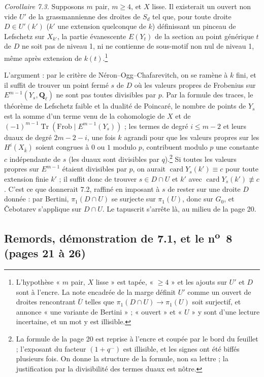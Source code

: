 \documentclass[11pt,a4paper]{article}
\begin{document}
\emph{Corollaire 7.3.} Supposons $m$ pair, $m \geqslant 4$, et $X$ lisse. Il
existerait un ouvert non vide $U'$ de la grassmannienne des droites de $S_d$ tel
que, pour toute droite $D \in U'(k')$ ($k'$ une extension quelconque de $k$)
définissant un pinceau de Lefschetz sur $X_{k'}$, la partie évanescente
$E(Y_t)$ de la section au point générique $t$ de $D$ ne soit pas de niveau 1, ni
ne contienne de sous-motif non nul de niveau 1, même après extension de
$k(t)$.\footnote{L'hypothèse « $m$ pair, $X$ lisse » est tapée, « $\geqslant 4$ »
et les ajouts sur $U'$ et $D$ sont à l'encre. La note encadrée de la marge définit
$U'$ comme un ouvert de droites rencontrant $\overline{U}$ telles que $\pi_1(D
\cap U) \to \pi_1(U)$ soit surjectif, et annonce « une variante de Bertini » ;
« ouvert » et « $U$ » y sont d'une lecture incertaine, et un mot y est illisible.}

L'argument : par le critère de Néron--Ogg--Chafarevitch, on se ramène à $k$ fini,
et il suffit de trouver un point fermé $s$ de $D$ où les valeurs propres de
Frobenius sur $E^{m-1}(Y_s, \mathbf{Q}_\ell)$ ne sont pas toutes divisibles par
$p$. Par la formule des traces, le théorème de Lefschetz faible et la dualité de
Poincaré, le nombre de points de $Y_s$ est la somme d'un terme venu de la
cohomologie de $X$ et de $(-1)^{m-1}\operatorname{Tr}(\mathrm{Frob} \mid
E^{m-1}(Y_s))$ ; les termes de degré $i \leqslant m-2$ et leurs duaux de degré
$2m-2-i$, une fois $k$ agrandi pour que les valeurs propres sur les
$H^i(X_{\bar k})$ soient congrues à $0$ ou $1$ modulo $p$, contribuent modulo
$p$ une constante $c$ indépendante de $s$ (les duaux sont divisibles par
$q$).\footnote{La formule de la page 20 est reprise à l'encre et coupée par le
bord du feuillet ; l'exposant du facteur $(1 + q^{\ldots})$ est illisible, et les
signes ont été biffés plusieurs fois. On donne la structure de la formule, non sa
lettre ; la justification par la divisibilité des termes duaux est nôtre.} Si
toutes les valeurs propres sur $E^{m-1}$ étaient divisibles par $p$, on aurait
$\operatorname{card} Y_s(k') \equiv c$ pour toute extension finie $k'$ ; il
suffit donc de trouver $s \in D \cap U$ et $k'$ avec $\operatorname{card}
Y_s(k') \not\equiv c$. C'est ce que donnerait 7.2, raffiné en imposant à $s$ de
rester sur une droite $D$ donnée : par Bertini, $\pi_1(D \cap U)$ se surjecte sur
$\pi_1(U)$, donc sur $G_0$, et Čebotarev s'applique sur $D \cap U$. Le
tapuscrit s'arrête là, au milieu de la page 20.

\subsection*{Remords, démonstration de 7.1, et le n\textsuperscript{o}~8 (pages 21 à 26)}
\end{document}
